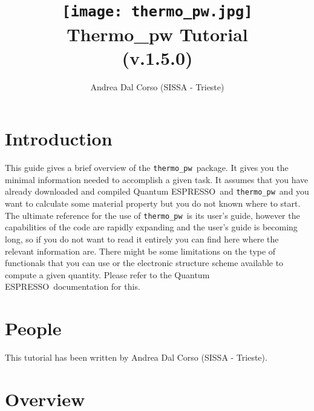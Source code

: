 \documentclass[12pt,a4paper]{article}
\def\version{1.5.0}
\def\qe{{\sc Quantum ESPRESSO}}
\def\thermo{\texttt{thermo\_pw}}
\begin{document}
 

\author{Andrea Dal Corso (SISSA - Trieste)}
\date{}

\title{
  \texttt{[image: thermo\_pw.jpg]} \\
  \vspace{3truecm}
  \Huge \color{blue} {\sc Thermo\_pw} Tutorial \\ (v.\version)
}

\maketitle

\newpage

\tableofcontents

\newpage

\section{\color{coral}Introduction}

This guide gives a brief overview of the \thermo\ package. 
It gives you the minimal information needed to accomplish a given task.
It assumes that you have already downloaded and compiled \qe\ and \thermo\  
and you want to calculate some material property but you do not known where 
to start. 
The ultimate reference for the use of \thermo\ is its user's guide,
however the capabilities of the code are rapidly expanding and the 
user's guide is becoming long, so if you do not want
to read it entirely you can find here where the relevant information are.
There might be some limitations on the type of functionals that you can use 
or the electronic structure scheme available to compute a given quantity.
Please refer to the \qe\ documentation for this.

\newpage

\section{\color{coral}People}
This tutorial has been written by Andrea Dal Corso (SISSA - Trieste). 

\newpage

\section{\color{coral}Overview}
\end{document}
